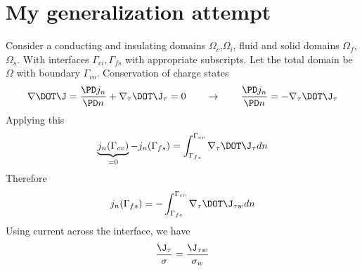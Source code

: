 \documentclass[11pt]{article}
\begin{document}
\newpage

\section{My generalization attempt}
Consider a conducting and insulating domains $\Omega_c$,$\Omega_i$, fluid and solid domains $\Omega_f$,$\Omega_s$. With interfaces $\Gamma_{ci},\Gamma_{fs}$ with appropriate subscripts. Let the total domain be $\Omega$ with boundary $\Gamma_{vo}$. Conservation of charge states
\begin{equation}
  \nabla \DOT \J =
  \frac{\PD j_n}{\PD n} +
  \nabla_{\tau} \DOT \J_{\tau} = 0
  \qquad
  \rightarrow
  \qquad
  \frac{\PD j_n}{\PD n} = -
  \nabla_{\tau} \DOT \J_{\tau}
\end{equation}
Applying this
\begin{equation}
  \underbrace{j_n (\Gamma_{cv})}_{=0} - j_n (\Gamma_{fs})
  =
  \int_{\Gamma_{fs}}^{\Gamma_{cv}} \nabla_{\tau} \DOT \J_{\tau}  dn
\end{equation}
Therefore
\begin{equation}
  j_n (\Gamma_{fs})
  =
  - \int_{\Gamma_{fs}}^{\Gamma_{cv}} \nabla_{\tau} \DOT \J_{\tau w}  dn
\end{equation}
Using current across the interface, we have
\begin{equation}
  \frac{\J_{\tau}}{\sigma} = \frac{\J_{\tau w}}{\sigma_w}
\end{equation}
\end{document}
